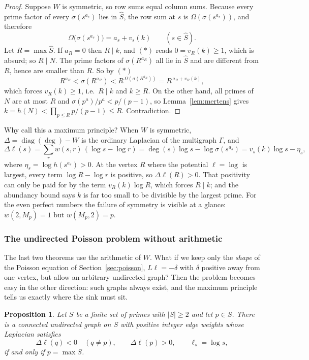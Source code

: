 \documentclass[11pt]{article}
\newtheorem{proposition}[theorem]{Proposition}
\theoremstyle{definition}
\theoremstyle{remark}
\begin{document}
\begin{proof}
Suppose $W$ is symmetric, so row sums equal column sums.  Because every prime
factor of every $\sigma(s^{a_s})$ lies in $\widehat S$, the row sum at $s$ is
$\Omega(\sigma(s^{a_s}))$, and therefore
\[
\Omega\bigl(\sigma(s^{a_s})\bigr)=a_s+v_s(k)\qquad(s\in\widehat S).
\tag{$*$}
\]
Let $R=\max\widehat S$.  If $a_R=0$ then $R\mid k$, and $(*)$ reads
$0=v_R(k)\ge1$, which is absurd; so $R\mid N$.  The prime factors of
$\sigma(R^{a_R})$ all lie in $\widehat S$ and are different from $R$, hence
are smaller than $R$.  So by $(*)$
\[
R^{a_R}<\sigma(R^{a_R})<R^{\,\Omega(\sigma(R^{a_R}))}=R^{\,a_R+v_R(k)},
\]
which forces $v_R(k)\ge1$, i.e.\ $R\mid k$ and $k\ge R$.  On the other
hand, all primes of $N$ are at most $R$ and
$\sigma(p^a)/p^a<p/(p-1)$, so Lemma~\ref{lem:mertens} gives
$k=h(N)<\prod_{p\le R}p/(p-1)\le R$.  Contradiction.
\end{proof}

Why call this a maximum principle?  When $W$ is symmetric,
$\Delta=\operatorname{diag}(\deg)-W$ is the ordinary Laplacian of the
multigraph $\Gamma$, and
\[
\Delta\ell(s)=\sum_r w(s,r)\,(\log s-\log r)
=\deg(s)\log s-\log\sigma(s^{a_s})
=v_s(k)\log s-\eta_s,
\]
where $\eta_s=\log h(s^{a_s})>0$.  At the vertex $R$ where the potential
$\ell=\log$ is largest, every term $\log R-\log r$ is positive, so
$\Delta\ell(R)>0$.  That positivity can only be paid for by the term
$v_R(k)\log R$, which forces $R\mid k$; and the abundancy bound says $k$ is
far too small to be divisible by the largest prime.  For the even perfect
numbers the failure of symmetry is visible at a glance: $w(2,M_p)=1$ but
$w(M_p,2)=p$.

\subsubsection{The undirected Poisson problem without arithmetic}

The last two theorems use the arithmetic of $W$.  What if we keep only the
\emph{shape} of the Poisson equation of Section~\ref{sec:poisson}, $L\ell=-\delta$ with
$\delta$ positive away from one vertex, but allow an arbitrary undirected
graph?  Then the problem becomes easy in the other direction: such graphs
always exist, and the maximum principle tells us exactly where the sink must
sit.

\begin{proposition}\label{prop:undirectedpoisson}
Let $S$ be a finite set of primes with $|S|\ge2$ and let $p\in S$.  There is
a connected undirected graph on $S$ with positive integer edge weights whose
Laplacian satisfies
\[
\Delta\ell(q)<0\quad(q\ne p),\qquad\Delta\ell(p)>0,
\qquad \ell_s=\log s,
\]
if and only if $p=\max S$.
\end{proposition}
\end{document}
